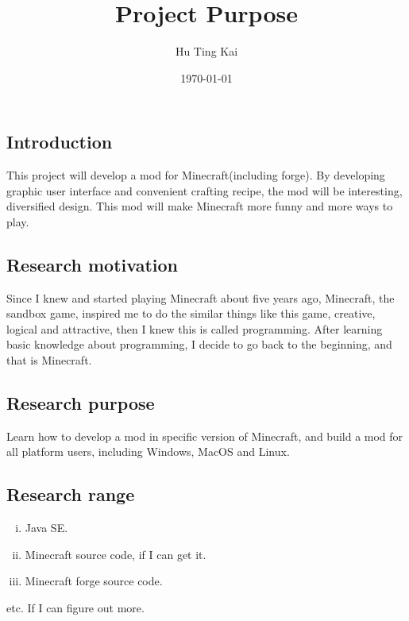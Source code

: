 \documentclass[12pt]{article}
\title{Project Purpose}
\date{\today}
\author{Hu Ting Kai}
\newcommand\tab[1][1cm]{\hspace*{#1}}
\begin{document}
	\maketitle
	\tableofcontents
	\newpage
	
	\begin{CJK}{UTF8}{bkai}
	\section{Introduction}
	\tab This project will develop a mod for Minecraft(including forge). By developing graphic user interface and convenient crafting recipe, the mod will be interesting, diversified design. This mod will make Minecraft more funny and more ways to play.
		\subsection{Research motivation}
		\tab Since I knew and started playing Minecraft about five years ago, Minecraft, the sandbox game, inspired me to do the similar things like this game, creative, logical and attractive, then I knew this is called programming. After learning basic knowledge about programming, I decide to go back to the beginning, and that is Minecraft.
		\subsection{Research purpose}
		\tab Learn how to develop a mod in specific version of Minecraft, and build a mod for all platform users, including Windows, MacOS and Linux. %
		\subsection{Research range}
		\begin{enumerate}[i.]
			\item Java SE.
			\item Minecraft source code, if I can get it.
			\item Minecraft forge source code.
		\end{enumerate}
		\tab etc. If I can figure out more.

\end{CJK}
\end{document}
